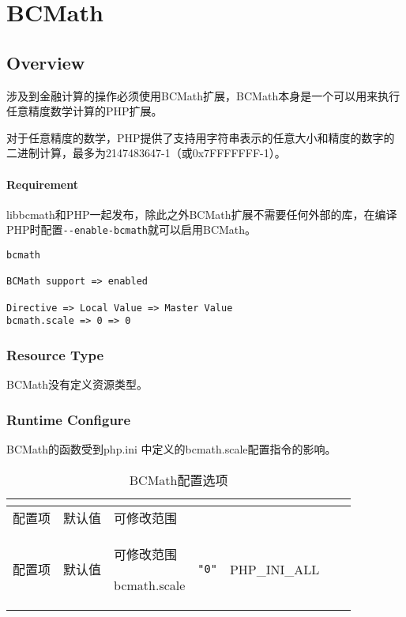 \part{BCMath}


\chapter{Overview}

涉及到金融计算的操作必须使用BCMath扩展，BCMath本身是一个可以用来执行任意精度数学计算的PHP扩展。

对于任意精度的数学，PHP提供了支持用字符串表示的任意大小和精度的数字的二进制计算，最多为2147483647-1（或0x7FFFFFFF-1）。






\subsection{Requirement}

libbcmath和PHP一起发布，除此之外BCMath扩展不需要任何外部的库，在编译PHP时配置\texttt{-\/-enable-bcmath}就可以启用BCMath。

\begin{lstlisting}
bcmath

BCMath support => enabled

Directive => Local Value => Master Value
bcmath.scale => 0 => 0
\end{lstlisting}

\section{Resource Type}

BCMath没有定义资源类型。





\section{Runtime Configure}

BCMath的函数受到php.ini 中定义的bcmath.scale配置指令的影响。


\begin{longtable}{|m{150pt}|m{40pt}|m{120pt}|}
\tabularnewline\hline
配置项&默认值&可修改范围
\endhead

\caption{BCMath配置选项}\\
\hline
配置项&默认值&可修改范围
\endfirsthead

\endfoot

\endlastfoot
\hline
bcmath.scale & \texttt{"0"}& PHP\_INI\_ALL\\
\hline
\end{longtable}


